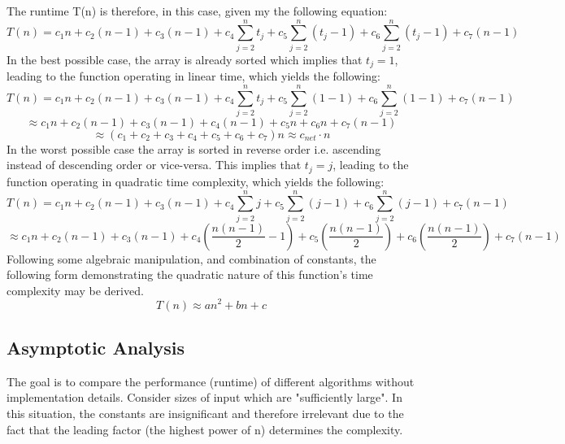 \documentclass[12pt,letterpaper]{article}
\begin{document}
The runtime T(n) is therefore, in this case, given my the following equation:
\[T(n)=c_1 n+c_2 (n-1)+ c_3 (n-1) + c_4  \sum_{j=2}^{n} t_j + c_5 \sum_{j=2}^{n}( t_j-1)+ c_6 \sum_{j=2}^{n}( t_j-1) + c_7 (n-1)\]
In the best possible case, the array is already sorted which implies that $t_j = 1$, leading to the function operating in linear time, which yields the following:
\[T(n)=c_1 n+c_2 (n-1)+ c_3 (n-1) + c_4  \sum_{j=2}^{n} t_j + c_5 \sum_{j=2}^{n}(1-1)+ c_6 \sum_{j=2}^{n}( 1-1) + c_7 (n-1) \] \[ \approx c_1 n+c_2 (n-1)+ c_3 (n-1) + c_4  (n-1) + c_5 n+ c_6 n + c_7 (n-1) \] \[ \approx (c_1 +c_2 + c_3  + c_4  + c_5 + c_6  + c_7 )n\approx c_{net}\cdot n\]
In the worst possible case the array is sorted in reverse order i.e. ascending instead of descending order or vice-versa. This implies that $t_j = j$, leading to the function operating in quadratic time complexity, which yields the following:
\[T(n)=c_1 n+c_2 (n-1)+ c_3 (n-1) + c_4  \sum_{j=2}^{n} j + c_5 \sum_{j=2}^{n}(j-1)+ c_6 \sum_{j=2}^{n}( j-1) + c_7 (n-1) \] \[\approx c_1 n+c_2 (n-1)+ c_3 (n-1) + c_4  \left(\frac{n(n-1)}{2}-1\right) + c_5 \left(\frac{n(n-1)}{2}\right)+ c_6 \left(\frac{n(n-1)}{2}\right) + c_7 (n-1) \]
Following some algebraic manipulation, and combination of constants, the following form demonstrating the quadratic nature of this function's time complexity may be derived.
\[T(n) \approx an^2 + bn + c \]

\subsection{Asymptotic Analysis}
The goal is to compare the performance (runtime) of different algorithms without implementation details. Consider sizes of input which are "sufficiently large". In this situation, the constants are insignificant and therefore irrelevant due to the fact that the leading factor (the highest power of n) determines the complexity.\\
\end{document}

